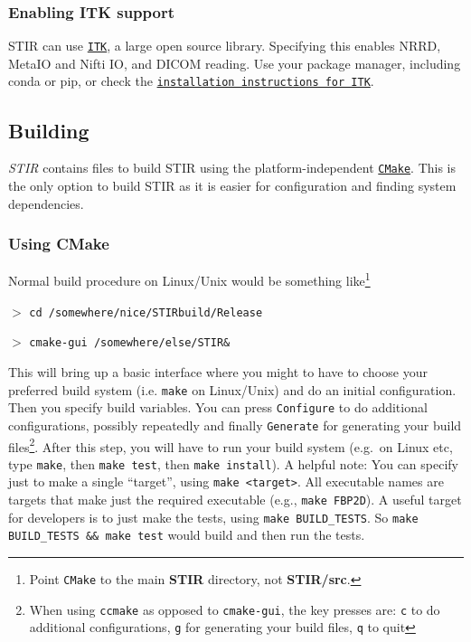 \documentclass{article}
\def\url#1#2{\mbox{\href{#1}{\tt #2}}}
\newcommand{\cmdline}[1]{\par \noindent $>$ \texttt{#1}\par}
\begin{document}
\subsubsection{
Enabling ITK support\label{sec:installITK}}
STIR can use \url{http://www.itk.org}{ITK}, a large open source library.  Specifying this
 enables NRRD, MetaIO and Nifti IO, and DICOM reading.
 Use your package manager, including conda or pip, or check the \url{https://itk.org/download/}{installation instructions for ITK}.

\subsection{
Building}
\textit{STIR} contains files to build STIR using the platform-independent
\url{"http://www.cmake.org"}{CMake}. This is the only option to build STIR as
it is easier for configuration and finding system dependencies.
\subsubsection{
Using CMake}
\label{sec:UsingCMake}

Normal build procedure on Linux/Unix would be something like\footnote{Point \texttt{CMake} to the main \textbf{STIR}
directory, not \textbf{STIR/src}.}

\cmdline{cd /somewhere/nice/STIRbuild/Release}
\cmdline{cmake-gui /somewhere/else/STIR\&}

This will bring up a basic interface where you might to have to choose your preferred
build system (i.e. \texttt{make} on Linux/Unix) and do an initial configuration. Then 
you specify build variables. You can press \texttt{Configure} to do additional configurations,
possibly repeatedly and finally \texttt{Generate} for generating your build files\footnote{
When using \texttt{ccmake} as opposed to \texttt{cmake-gui}, the key presses are:
\texttt{c} to do additional configurations, \texttt{g} for generating
your build files, \texttt{q} to quit}. After this step, you will have to run your build system (e.g.\ on Linux etc,
type \texttt{make}, then \texttt{make test}, then \texttt{make install}).
A helpful note: You can specify just to make a single ``target'',
using \texttt{make <target>}. All executable names are targets that
make just the required executable (e.g., \texttt{make FBP2D}). A
useful target for developers is to just make the tests, using
\texttt{make BUILD\_TESTS}. So \texttt{make BUILD\_TESTS \&\& make test}
would build and then run the tests.
\end{document}
